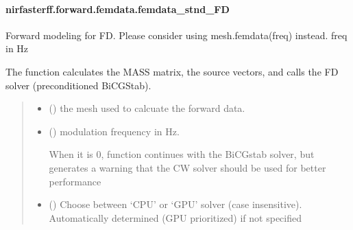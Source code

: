 \documentclass[letterpaper,10pt,english]{sphinxmanual}
\begin{document}
\sphinxstepscope


\paragraph{nirfasterff.forward.femdata.femdata\_stnd\_FD}
\label{\detokenize{_autosummary/nirfasterff.forward.femdata.femdata_stnd_FD:nirfasterff-forward-femdata-femdata-stnd-fd}}\label{\detokenize{_autosummary/nirfasterff.forward.femdata.femdata_stnd_FD::doc}}

\begin{fulllineitems}
\label{\detokenize{_autosummary/nirfasterff.forward.femdata.femdata_stnd_FD:nirfasterff.forward.femdata.femdata_stnd_FD}}
\pysigstartsignatures
{}
\pysigstopsignatures
\sphinxAtStartPar
Forward modeling for FD. Please consider using mesh.femdata(freq) instead. freq in Hz

\sphinxAtStartPar
The function calculates the MASS matrix, the source vectors, and calls the FD solver (preconditioned BiCGStab).
\begin{quote}\begin{description}
\begin{itemize}
\item {} 
\sphinxAtStartPar
{} () \textendash{} the mesh used to calcuate the forward data.

\item {} 
\sphinxAtStartPar
{} () \textendash{} 
\sphinxAtStartPar
modulation frequency in Hz.

\sphinxAtStartPar
When it is 0, function continues with the BiCGstab solver, but generates a warning that the CW solver should be used for better performance


\item {} 
\sphinxAtStartPar
{} (\sphinxstyleliteralemphasis{\sphinxupquote{, }}) \textendash{} Choose between ‘CPU’ or ‘GPU’ solver (case insensitive). Automatically determined (GPU prioritized) if not specified


\end{itemize}
\end{description}
\end{quote}
\end{fulllineitems}
\end{document}
